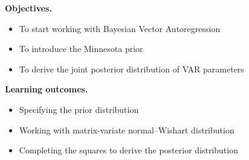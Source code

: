 \documentclass[notes,blackandwhite,mathsans,usenames,dvipsnames]{beamer}
\begin{document}
{
\begin{frame}

\bigskip\textbf{\color{mcxs1}Objectives.}
\begin{itemize}[label=$\blacktriangleright$]
\item {\color{mcxs1}To start working with Bayesian Vector Autoregression}
\item {\color{mcxs1}To introduce the Minnesota prior}
\item {\color{mcxs1}To derive the joint posterior distribution of VAR parameters}
\end{itemize}

\bigskip\textbf{\color{mcxs4}Learning outcomes.}
\begin{itemize}[label=$\blacktriangleright$]
\item {\color{mcxs4}Specifying the prior distribution}
\item {\color{mcxs4}Working with matrix-variate normal--Wishart distribution}
\item {\color{mcxs4}Completing the squares to derive the posterior distribution}
\end{itemize}

\end{frame}
}
\end{document}
